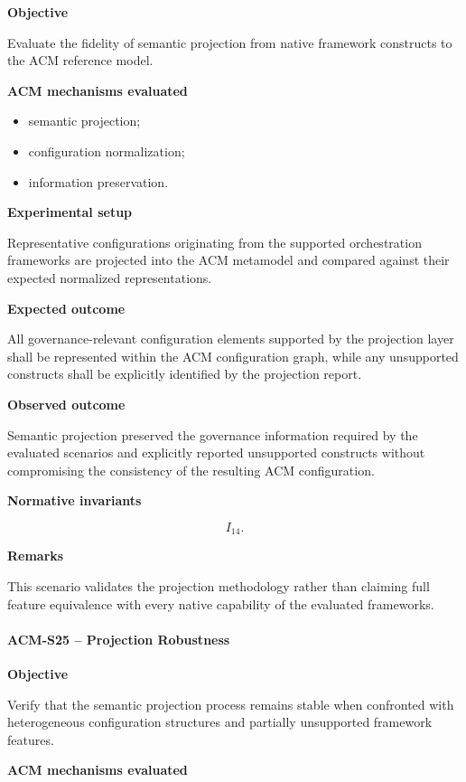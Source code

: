 \documentclass[10pt]{article}
\begin{document}
\textbf{Objective}

Evaluate the fidelity of semantic projection from native framework constructs
to the ACM reference model.

\textbf{ACM mechanisms evaluated}

\begin{itemize}
    \item semantic projection;
    \item configuration normalization;
    \item information preservation.
\end{itemize}

\textbf{Experimental setup}

Representative configurations originating from the supported orchestration
frameworks are projected into the ACM metamodel and compared against their
expected normalized representations.

\textbf{Expected outcome}

All governance-relevant configuration elements supported by the projection
layer shall be represented within the ACM configuration graph, while any
unsupported constructs shall be explicitly identified by the projection report.

\textbf{Observed outcome}

Semantic projection preserved the governance information required by the
evaluated scenarios and explicitly reported unsupported constructs without
compromising the consistency of the resulting ACM configuration.

\textbf{Normative invariants}

\[
I_{14}.
\]

\textbf{Remarks}

This scenario validates the projection methodology rather than claiming full
feature equivalence with every native capability of the evaluated frameworks.

\paragraph{ACM-S25 -- Projection Robustness}

\textbf{Objective}

Verify that the semantic projection process remains stable when confronted with
heterogeneous configuration structures and partially unsupported framework
features.

\textbf{ACM mechanisms evaluated}
\end{document}
